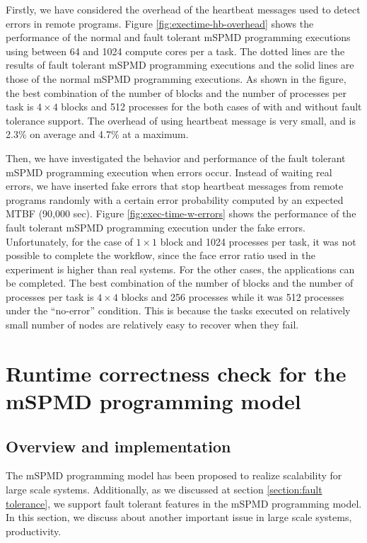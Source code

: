 \documentclass[graybox]{svmult}
\begin{document}
Firstly, we have considered the overhead of the heartbeat messages used to detect errors in remote programs. 
Figure \ref{fig:exectime-hb-overhead} shows the performance of 
the normal and fault tolerant mSPMD programming executions using between 64 and 1024 compute cores per a task. 
The dotted lines are the results of fault tolerant mSPMD programming executions and the solid lines are those of the normal mSPMD programming executions. As shown in the figure, the best combination of the number of blocks and the number of processes per task is $4\times 4$ blocks and 512 processes for the both cases of with and without fault tolerance support. 
The overhead of using heartbeat message is very small, and is 2.3\% on average and 4.7\% at a maximum.

Then, we have investigated the behavior and performance of the fault tolerant mSPMD programming execution when errors occur. 
Instead of waiting real errors, we have inserted fake errors that stop heartbeat messages from remote programs randomly with a certain error probability computed by an expected MTBF (90,000 sec). 
Figure \ref{fig:exec-time-w-errors} shows the performance of the fault tolerant mSPMD programming execution under the fake errors. Unfortunately, for the case of $1\times 1$ block and 1024 processes per task, it was not possible to complete the workflow, since the face error ratio used in the experiment is higher than real systems. 
For the other cases, the applications can be completed. 
The best combination of the number of blocks and the number of processes per task is $4 \times 4$ blocks and 256 processes while it was 512 processes under the ``no-error'' condition. This is because the tasks executed on relatively small number of nodes are relatively easy to recover when they fail. 

\section{Runtime correctness check for the mSPMD programming model}
\label{section:Runtime correctness check for the mSPMD programming model}

\subsection{Overview and implementation}

The mSPMD programming model has been proposed to realize scalability for large scale systems. Additionally, as we discussed at section \ref{section:fault tolerance}, we support fault tolerant features in the mSPMD programming model. 
In this section, we discuss about another important issue in large scale systems, productivity. 
\end{document}
